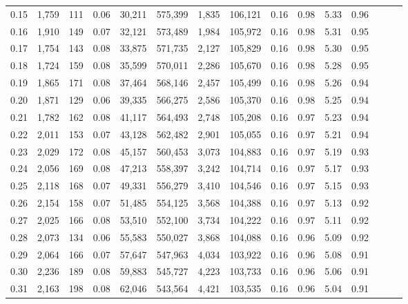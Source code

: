 \begin{tabular}{rrrrrrrrrrrrrrr}
0.15 &   1,759 &    111 &  0.06 &   30,211 &  575,399 &    1,835 &  106,121 &  0.16 &  0.98 &  5.33 &      0.96 \\
0.16 &   1,910 &    149 &  0.07 &   32,121 &  573,489 &    1,984 &  105,972 &  0.16 &  0.98 &  5.31 &      0.95 \\
0.17 &   1,754 &    143 &  0.08 &   33,875 &  571,735 &    2,127 &  105,829 &  0.16 &  0.98 &  5.30 &      0.95 \\
0.18 &   1,724 &    159 &  0.08 &   35,599 &  570,011 &    2,286 &  105,670 &  0.16 &  0.98 &  5.28 &      0.95 \\
0.19 &   1,865 &    171 &  0.08 &   37,464 &  568,146 &    2,457 &  105,499 &  0.16 &  0.98 &  5.26 &      0.94 \\
0.20 &   1,871 &    129 &  0.06 &   39,335 &  566,275 &    2,586 &  105,370 &  0.16 &  0.98 &  5.25 &      0.94 \\
0.21 &   1,782 &    162 &  0.08 &   41,117 &  564,493 &    2,748 &  105,208 &  0.16 &  0.97 &  5.23 &      0.94 \\
0.22 &   2,011 &    153 &  0.07 &   43,128 &  562,482 &    2,901 &  105,055 &  0.16 &  0.97 &  5.21 &      0.94 \\
0.23 &   2,029 &    172 &  0.08 &   45,157 &  560,453 &    3,073 &  104,883 &  0.16 &  0.97 &  5.19 &      0.93 \\
0.24 &   2,056 &    169 &  0.08 &   47,213 &  558,397 &    3,242 &  104,714 &  0.16 &  0.97 &  5.17 &      0.93 \\
0.25 &   2,118 &    168 &  0.07 &   49,331 &  556,279 &    3,410 &  104,546 &  0.16 &  0.97 &  5.15 &      0.93 \\
0.26 &   2,154 &    158 &  0.07 &   51,485 &  554,125 &    3,568 &  104,388 &  0.16 &  0.97 &  5.13 &      0.92 \\
0.27 &   2,025 &    166 &  0.08 &   53,510 &  552,100 &    3,734 &  104,222 &  0.16 &  0.97 &  5.11 &      0.92 \\
0.28 &   2,073 &    134 &  0.06 &   55,583 &  550,027 &    3,868 &  104,088 &  0.16 &  0.96 &  5.09 &      0.92 \\
0.29 &   2,064 &    166 &  0.07 &   57,647 &  547,963 &    4,034 &  103,922 &  0.16 &  0.96 &  5.08 &      0.91 \\
0.30 &   2,236 &    189 &  0.08 &   59,883 &  545,727 &    4,223 &  103,733 &  0.16 &  0.96 &  5.06 &      0.91 \\
0.31 &   2,163 &    198 &  0.08 &   62,046 &  543,564 &    4,421 &  103,535 &  0.16 &  0.96 &  5.04 &      0.91 \\

\end{tabular}
